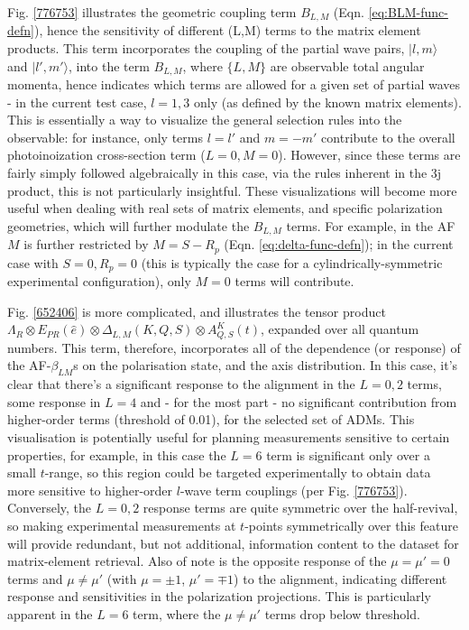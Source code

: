 \documentclass[10pt]{article}
\begin{document}
Fig. \ref{776753} illustrates the geometric coupling term $B_{L,M}$ (Eqn. \ref{eq:BLM-func-defn}), hence the sensitivity of different (L,M) terms to the matrix element products. This term incorporates the coupling of the partial wave pairs, $|l,m\rangle$ and $|l',m'\rangle$, into the term $B_{L,M}$, where $\{L,M\}$ are observable total angular momenta, 
hence indicates which terms are allowed for a given set of partial waves - in the current test case, $l=1,3$ only (as defined by the known matrix elements). This is essentially a way to visualize the general selection rules into the observable: for instance, only terms $l=l'$ and $m=-m'$ contribute to the overall photoinoization cross-section term ($L=0, M=0$). However, since these terms are fairly simply followed algebraically in this case, via the rules inherent in the 3j product, this is not particularly insightful. These visualizations will become more useful when dealing with real sets of matrix elements, and specific polarization geometries, which will further modulate the $B_{L,M}$ terms. For example, in the AF $M$ is further restricted by $M = S-R_{p}$ (Eqn. \ref{eq:delta-func-defn}); in the current case with $S=0, R_p=0$ (this is typically the case for a cylindrically-symmetric experimental configuration), only $M=0$ terms will contribute.

Fig. \ref{652406} is more complicated, and illustrates the tensor product $\Lambda_{R}\otimes E_{PR}(\hat{e})\otimes \Delta_{L,M}(K,Q,S)\otimes A^{K}_{Q,S}(t)$, expanded over all quantum numbers.
This term, therefore, incorporates all of the dependence (or response) of the AF-$\beta_{LM}$s on the polarisation state, and the axis distribution. In this case, it's clear that there's a significant response to the alignment in the $L=0,2$ terms, some response in $L=4$ and - for the most part - no significant contribution from higher-order terms (threshold of 0.01), for the selected set of ADMs. This visualisation is potentially useful for planning measurements sensitive to certain properties, for example, in this case the $L=6$ term is significant only over a small $t$-range, so this region could be targeted experimentally to obtain data more sensitive to higher-order $l$-wave term couplings (per Fig. \ref{776753}). Conversely, the $L=0,2$ response terms are quite symmetric over the half-revival, so making experimental measurements at $t$-points symmetrically over this feature will provide redundant, but not additional, information content to the dataset for matrix-element retrieval. Also of note is the opposite response of the $\mu=\mu'=0$ terms and $\mu\neq\mu'$ (with $\mu=\pm1$, $\mu'=\mp1$) to the alignment, indicating different response and sensitivities in the polarization projections. This is particularly apparent in the $L=6$ term, where the $\mu\neq\mu'$ terms drop below threshold.
\end{document}
